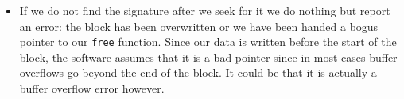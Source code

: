 \documentclass[12pt,a4paper]{memoir} %
\begin{document}
{{\begin{itemize}
\item
If we do not find the signature after we seek for it we do nothing but report an error:
the block has been overwritten or we have been handed a bogus pointer to our \verb,free,
function. Since our data is written before the start of the block, the software assumes
that it is a bad pointer since in most cases buffer overflows go beyond the end
of the block. It could be that it is actually a buffer overflow error however.
\end{itemize}
}}
\end{document}
